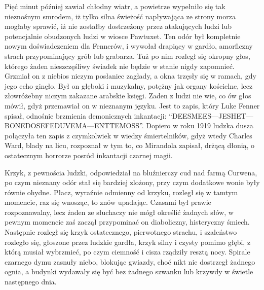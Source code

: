 Pięć minut później zawiał chłodny wiatr, a powietrze wypełniło się tak nieznośnym smrodem, iż tylko silna świeżość napływająca ze strony morza mogłaby sprawić, iż nie zostałby dostrzeżony przez atakujących ludzi lub potencjalnie obudzonych ludzi w wiosce Pawtuxet. Ten odór był kompletnie nowym doświadczeniem dla Fennerów, i wywołał drapiący w gardło, amorficzny strach przypominający grób lub grabarza. Tuż po nim rozległ się okropny głos, którego żaden nieszczęśliwy świadek nie będzie w stanie nigdy zapomnieć.  Grzmiał on z niebios niczym posłaniec zagłady, a okna trzęsły się w ramach, gdy jego echo ginęło. Był on głęboki i muzykalny, potężny jak organy kościelne, lecz złowróżebny niczym zakazane arabskie księgi. Zaden z ludzi nie wie, co ów głos mówił, gdyż przemawiał on w nieznanym języku. Jest to zapis, który Luke Fenner spisał, odnośnie brzmienia demonicznych inkantacji: ``DEESMEES—JESHET—BONEDOSEFEDUVEMA—ENTTEMOSS''. Dopiero w roku 1919 ludzka dusza połączyła ten zapis z czymkolwiek w wiedzy śmiertelników, gdyż wtedy Charles Ward, blady na licu, rozpoznał w tym to, co Mirandola zapisał, drżącą dłonią, o ostatecznym horrorze posród inkantacji czarnej magii.

Krzyk, z pewnościa ludzki, odpowiedział na bluźnierczy cud nad farmą Curwena, po czym nieznany odór stał się bardziej zlożony, przy czym dodatkowe wonie były równie ohydne. Płacz, wyraźnie odmienny od krzyku, rozległ się w tamtym momencie, raz się wnosząc, to znów upadając. Czasami był prawie rozpoznawalny, lecz żaden ze słuchaczy nie mógł określić żadnych słów, w pewnym momencie zaś zaczął przypominać on diaboliczny, histeryczny śmiech. Następnie rozległ się krzyk ostatecznego, pierwotnego strachu, i szaleństwo rozległo się, głoszone przez ludzkie gardła, krzyk silny i czysty pomimo głębi, z którą musiał wybrzmieć, po czym ciemność i cisza rządziły resztą nocy. Spirale czarnego dymu zasnuły niebo, blokując gwiazdy, choć nikt nie dostrzegł żadnego ognia, a budynki wydawały się być bez żadnego szwanku lub krzywdy w świetle następnego dnia.

